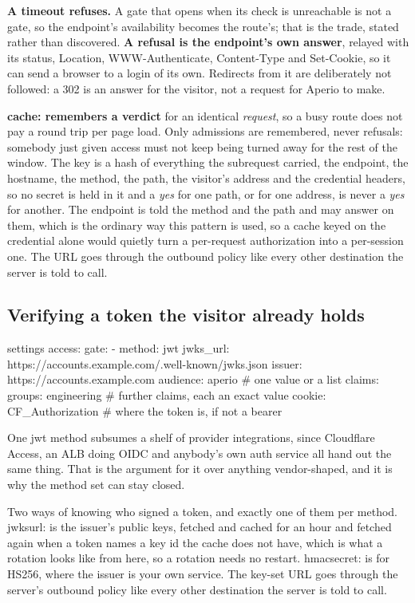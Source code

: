 \documentclass[11pt,a4paper,oneside]{book}
\newcommand{\aperiobreakableunderscore}{\textunderscore\allowbreak}
\newcommand{\aperiocodebreaks}{\XeTeXinterchartokenstate=1 }
\newcommand{\aperiocodebreaks}{}
\DeclareRobustCommand{\code}[1]{{\ttfamily\small\aperiocodebreaks
  \let\_\aperiobreakableunderscore#1}}
\begin{document}
\textbf{A timeout refuses.} A gate that opens when its check is
unreachable is not a gate, so the endpoint's availability becomes the
route's; that is the trade, stated rather than discovered. \textbf{A
refusal is the endpoint's own answer}, relayed with its status,
\code{Location}, \code{WWW-Authenticate}, \code{Content-Type} and
\code{Set-Cookie}, so it can send a browser to a login of its own.
Redirects from it are deliberately not followed: a \code{302} is an
answer for the visitor, not a request for Aperio to make.

\textbf{\code{cache:} remembers a verdict} for an identical
\emph{request}, so a busy route does not pay a round trip per page load.
Only admissions are remembered, never refusals: somebody just given
access must not keep being turned away for the rest of the window. The
key is a hash of everything the subrequest carried, the endpoint, the
hostname, the method, the path, the visitor's address and the credential
headers, so no secret is held in it and a \emph{yes} for one path, or for
one address, is never a \emph{yes} for another. The endpoint is told the method and the path and may answer on
them, which is the ordinary way this pattern is used, so a cache keyed on
the credential alone would quietly turn a per-request authorization into
a per-session one. The URL goes through the outbound policy like every other
destination the server is told to call.

\subsection{Verifying a token the visitor already holds}

\begin{codecard}[aperioyaml]{settings}
access:
  gate:
    - method: jwt
      jwks_url: https://accounts.example.com/.well-known/jwks.json
      issuer: https://accounts.example.com
      audience: aperio                 # one value or a list
      claims: { groups: engineering }  # further claims, each an exact value
      cookie: CF_Authorization         # where the token is, if not a bearer
\end{codecard}

One \code{jwt} method subsumes a shelf of provider integrations, since
Cloudflare Access, an ALB doing OIDC and anybody's own auth service all
hand out the same thing. That is the argument for it over anything
vendor-shaped, and it is why the method set can stay closed.

Two ways of knowing who signed a token, and exactly one of them per
method. \code{jwks\_url:} is the issuer's public keys, fetched and cached
for an hour and fetched again when a token names a key id the cache does
not have, which is what a rotation looks like from here, so a rotation
needs no restart. \code{hmac\_secret:} is for \code{HS256}, where the
issuer is your own service. The key-set URL goes through the server's
outbound policy like every other destination the server is told to call.
\end{document}
